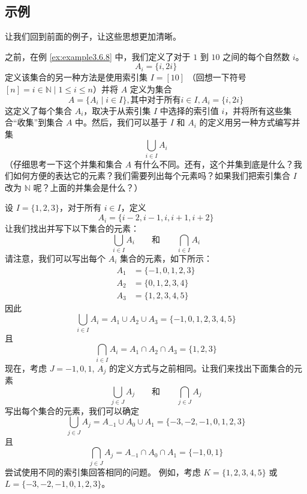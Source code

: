 \subsection{示例}

让我们回到前面的例子，让这些思想更加清晰。\\

\begin{example}
    之前，在例 \ref{ex:example3.6.8} 中，我们定义了对于 $1$ 到 $10$ 之间的每个自然数 $i$。
    \[A_i = \{i, 2i\}\]
    定义该集合的另一种方法是使用索引集 $I = [10]$ （回想一下符号 $[n] = {i \in \mathbb{N} \mid 1 \le i \le n}$）并将 $A$ 定义为集合
    \[A = \{A_i \mid i \in I\}, \text{其中对于所有} i \in I, A_i = \{i, 2i\}\]
    这定义了每个集合 $A_i$，取决于从索引集 $I$ 中选择的索引值 $i$，并将所有这些集合``收集''到集合 $A$ 中。然后，我们可以基于 $I$ 和 $A_i$ 的定义用另一种方式编写并集
    \[\bigcup_{i \in I} A_i\]
    （仔细思考一下这个并集和集合 $A$ 有什么不同。还有，这个并集到底是什么？我们如何方便的表达它的元素？我们需要列出每个元素吗？如果我们把索引集合 $I$ 改为 $\mathbb{N}$ 呢？上面的并集会是什么？）
\end{example}

\begin{example}
    设 $I = \{1, 2, 3\}$，对于所有 $i \in I$，定义
    \[A_i = \{i - 2, i - 1, i, i + 1, i + 2\}\]
    让我们找出并写下以下集合的元素：
    \[\bigcup_{i \in I} A_i \qquad\text{和}\qquad \bigcap_{i \in I} A_i\]
    请注意，我们可以写出每个 $A_i$ 集合的元素，如下所示：
    \begin{align*}
        A_1 &= \{-1, 0, 1, 2, 3\} \\
        A_2 &= \{0, 1, 2, 3, 4\} \\
        A_3 &= \{1, 2, 3, 4, 5\}
    \end{align*}
    因此
    \[\bigcup_{i \in I} A_i = A_1 \cup A_2 \cup A_3 = \{-1, 0, 1, 2, 3, 4, 5\}\]
    且
    \[\bigcap_{i \in I} A_i = A_1 \cap A_2 \cap A_3 = \{1, 2, 3\}\]
    现在，考虑 $J = {-1, 0, 1}$, $A_j$ 的定义方式与之前相同。让我们来找出下面集合的元素
    \[\bigcup_{j \in J} A_j \qquad\text{和}\qquad \bigcap_{j \in J} A_j\]
    写出每个集合的元素，我们可以确定
    \[\bigcup_{j \in J} A_j = A_{-1} \cup A_0 \cup A_1 = \{-3, -2, -1, 0, 1, 2, 3\}\]
    且
    \[\bigcap_{j \in J} A_j = A_{-1} \cap A_0 \cap A_1 = \{-1, 0, 1\}\]
    尝试使用不同的索引集回答相同的问题。
    例如，考虑 $K = \{1, 2, 3, 4, 5\}$ 或 $L = \{-3, -2, -1, 0, 1, 2, 3\}$。
\end{example}

